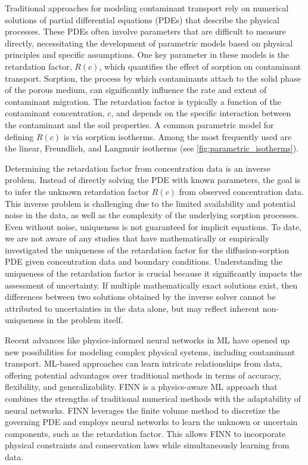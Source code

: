 Traditional approaches for modeling contaminant transport rely on numerical solutions of partial differential equations (PDEs) that describe the physical processes. These PDEs often involve parameters that are difficult to measure directly, necessitating the development of parametric models based on physical principles and specific assumptions.
One key parameter in these models is the retardation factor, $R(c)$, which quantifies the effect of sorption on contaminant transport. Sorption, the process by which contaminants attach to the solid phase of the porous medium, can significantly influence the rate and extent of contaminant migration. The retardation factor is typically a function of the contaminant concentration, $c$, and depends on the specific interaction between the contaminant and the soil properties.
A common parametric model for defining $R(c)$ is via sorption isotherms. Among the most frequently used are the linear, Freundlich, and Langmuir isotherms \cite{finn} (see \cref{fig:parametric_isotherms}).

Determining the retardation factor from concentration data is an inverse problem. Instead of directly solving the PDE with known parameters, the goal is to infer the unknown retardation factor $R(c)$ from observed concentration data. This inverse problem is challenging due to the limited availability and potential noise in the data, as well as the complexity of the underlying sorption processes. Even without noise, uniqueness is not guaranteed for implicit equations. To date, we are not aware of any studies that have mathematically or empirically investigated the uniqueness of the retardation factor for the diffusion-sorption PDE given concentration data and boundary conditions. Understanding the uniqueness of the retardation factor is crucial because it significantly impacts the assessment of uncertainty. If multiple mathematically exact solutions exist, then differences between two solutions obtained by the inverse solver cannot be attributed to uncertainties in the data alone, but may reflect inherent non-uniqueness in the problem itself.

Recent advances like physics-informed neural networks in ML have opened up new possibilities for modeling complex physical systems, including contaminant transport. ML-based approaches can learn intricate relationships from data, offering potential advantages over traditional methods in terms of accuracy, flexibility, and generalizability. FINN \cite{finn} is a physics-aware ML approach that combines the strengths of traditional numerical methods with the adaptability of neural networks. FINN leverages the finite volume method to discretize the governing PDE and employs neural networks to learn the unknown or uncertain components, such as the retardation factor. This allows FINN to incorporate physical constraints and conservation laws while simultaneously learning from data.

